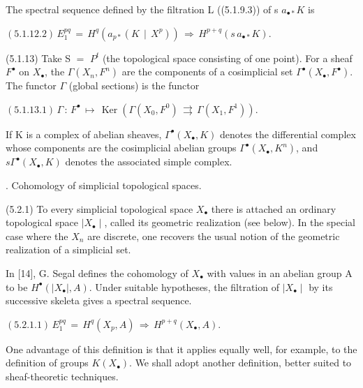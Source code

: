 \documentclass[11pt,twoside]{article}
\newcommand{\DFormula}[1]{%
  \par\smallskip\noindent\hspace*{0pt}\(\displaystyle #1\)\par\smallskip
}
\begin{document}
The spectral sequence defined by the filtration L ((5.1.9.3)) of s \(a_{\bullet \ast }K\) is\par
\par\medskip
\DFormula{(5.1.12.2)\,E_{1}^{pq}\,=\,H^{q}(a_{p\ast }(K\,\mid \,X^{p}))\,\Rightarrow \,H^{p+q}(s\,a_{\bullet \ast }K).}
\par\medskip
(5.1.13) Take S \(=\) \(P^{t}\) (the topological space consisting of one point). For a sheaf \(F^{\bullet }\) on \(X_{\bullet }\), the \(\Gamma (X_{n},F^{n})\) are the components of a cosimplicial set \(\Gamma ^{\bullet }(X_{\bullet },F^{\bullet })\). The functor \(\Gamma \) (global sections) is the functor\par
\par\medskip
\DFormula{(5.1.13.1)\,\Gamma \,:\,F^{\bullet }\,↦\,\operatorname{Ker}(\Gamma (X_{0},F^{0})\,\rightrightarrows \,\Gamma (X_{1},F^{1})).}
\par\medskip
If K is a complex of abelian sheaves, \(\Gamma ^{\bullet }(X_{\bullet },K)\) denotes the differential complex whose components are the cosimplicial abelian groups \(\Gamma ^{\bullet }(X_{\bullet },K^{n})\), and \(s\Gamma ^{\bullet }(X_{\bullet },K)\) denotes the associated simple complex.\par
\par{}. Cohomology of simplicial topological spaces.\par
\par\medskip
(5.2.1) To every simplicial topological space \(X_{\bullet }\) there is attached an ordinary topological space \(\mid X_{\bullet }\mid \), called its geometric realization (see below). In the special case where the \(X_{n}\) are discrete, one recovers the usual notion of the geometric realization of a simplicial set.\par
\par\medskip
In [14], G. Segal defines the cohomology of \(X_{\bullet }\) with values in an abelian group A to be \(H^{\bullet }(\mid X_{\bullet }\mid ,A)\). Under suitable hypotheses, the filtration of \(\mid X_{\bullet }\mid \) by its successive skeleta gives a spectral sequence.\par
\par\medskip
\DFormula{(5.2.1.1)\,E_{1}^{pq}\,=\,H^{q}(X_{p},A)\,\Rightarrow \,H^{p+q}(X_{\bullet },A).}
\par\medskip
One advantage of this definition is that it applies equally well, for example, to the definition of groups \(K(X_{\bullet })\). We shall adopt another definition, better suited to sheaf-theoretic techniques.\par
\end{document}
